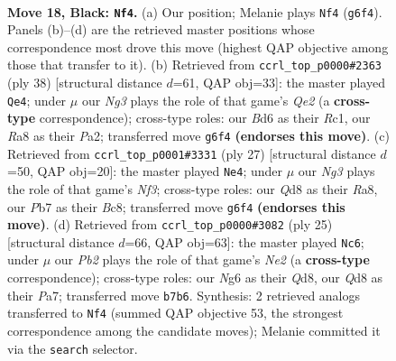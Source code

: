 \documentclass[11pt]{article}
\begin{document}
\clearpage

\begin{figure}[p]\centering
\begin{subfigure}{0.46\textwidth}\centering
\resizebox{\linewidth}{!}{%
\newchessgame
\chessboard[
  setfen={r1bq1rk1/pp4pp/3b1pn1/3p4/8/1B1P1N1P/PPPB1PP1/R2QR1K1 b - - 3 18},
  showmover=false,
  pgfstyle=straightmove, color=movearrow, markmove={g6-f4}
]}
\caption{}
\end{subfigure}\hfill
\begin{subfigure}{0.46\textwidth}\centering
\resizebox{\linewidth}{!}{%
\newchessgame
\chessboard[
  setfen={r2q1rk1/pb2bpp1/1p2p2p/3nN3/3P4/3B4/PP1BQPPP/2R2RK1 w - - 3 20},
  showmover=false,
  pgfstyle=straightmove, color=movearrow, markmove={e2-e4}
]}
\caption{}
\end{subfigure}
\\[4pt]
\begin{subfigure}{0.46\textwidth}\centering
\resizebox{\linewidth}{!}{%
\newchessgame
\chessboard[
  setfen={r1bq1rk1/pp3pp1/5n1p/2bp4/8/3BPNB1/PP3PPP/2RQ1RK1 b - - 1 14},
  showmover=false,
  pgfstyle=straightmove, color=movearrow, markmove={f6-e4}
]}
\caption{}
\end{subfigure}\hfill
\begin{subfigure}{0.46\textwidth}\centering
\resizebox{\linewidth}{!}{%
\newchessgame
\chessboard[
  setfen={r2q1rk1/pp2nppp/3bb3/3p4/3P4/1B3N2/PP1B1PPP/R2QR1K1 b - - 3 13},
  showmover=false,
  pgfstyle=straightmove, color=movearrow, markmove={e7-c6}
]}
\caption{}
\end{subfigure}
\caption{\textbf{Move 18, Black: \texttt{Nf4}.} (a) Our position; Melanie plays \texttt{Nf4} (\texttt{g6f4}). Panels (b)--(d) are the retrieved master positions whose correspondence most drove this move (highest QAP objective among those that transfer to it). (b) Retrieved from \texttt{ccrl\_top\_p0000\#2363} (ply 38) [structural distance $d$=61, QAP obj=33]: the master played \texttt{Qe4}; under $\mu$ our \emph{Ng3} plays the role of that game's \emph{Qe2} (a \textbf{cross-type} correspondence); cross-type roles: our \emph{B}d6 as their \emph{R}c1, our \emph{R}a8 as their \emph{P}a2; transferred move \texttt{g6f4} \textbf{(endorses this move)}. (c) Retrieved from \texttt{ccrl\_top\_p0001\#3331} (ply 27) [structural distance $d$=50, QAP obj=20]: the master played \texttt{Ne4}; under $\mu$ our \emph{Ng3} plays the role of that game's \emph{Nf3}; cross-type roles: our \emph{Q}d8 as their \emph{R}a8, our \emph{P}b7 as their \emph{B}c8; transferred move \texttt{g6f4} \textbf{(endorses this move)}. (d) Retrieved from \texttt{ccrl\_top\_p0000\#3082} (ply 25) [structural distance $d$=66, QAP obj=63]: the master played \texttt{Nc6}; under $\mu$ our \emph{Pb2} plays the role of that game's \emph{Ne2} (a \textbf{cross-type} correspondence); cross-type roles: our \emph{N}g6 as their \emph{Q}d8, our \emph{Q}d8 as their \emph{P}a7; transferred move \texttt{b7b6}. Synthesis: 2 retrieved analogs transferred to \texttt{Nf4} (summed QAP objective 53, the strongest correspondence among the candidate moves); Melanie committed it via the \texttt{search} selector.}
\label{fig:thought-m35}
\end{figure}
\end{document}
